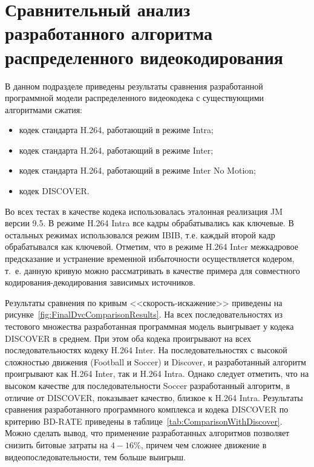 \section{Сравнительный анализ разработанного алгоритма распределенного видеокодирования}

В данном подразделе приведены результаты сравнения разработанной программной модели распределенного видеокодека с существующими алгоритмами сжатия: 
\begin{itemize}
    \item кодек стандарта H.264, работающий в режиме Intra;
    \item кодек стандарта H.264, работающий в режиме Inter;
    \item кодек стандарта H.264, работающий в режиме Inter No Motion;
    \item кодек DISCOVER.
\end{itemize}

Во всех тестах в качестве кодека использовалась эталонная реализация JM версии 9.5. В режиме H.264 Intra все кадры обрабатывались как ключевые. В остальных режимах использовался режим IBIB, т.е. каждый второй кадр обрабатывался как ключевой. Отметим, что в режиме H.264 Inter межкадровое предсказание и устранение временной избыточности осуществляется кодером, т.~е. данную кривую можно рассматривать в качестве примера для совместного кодирования-декодирования зависимых источников.

Результаты сравнения по кривым <<скорость-искажение>> приведены на рисунке~\ref{fig:FinalDvcComparisonResults}. На всех последовательностях из тестового множества разработанная программная модель выигрывает у кодека DISCOVER в среднем. При этом оба кодека проигрывают на всех последовательностях кодеку H.264 Inter. На последовательностях с высокой сложностью движения (Football и Soccer) и Discover, и разработанный алгоритм проигрывают как H.264 Inter, так и H.264 Intra. Однако следует отметить, что на высоком качестве для последовательности Soccer разработанный алгоритм, в отличие от DISCOVER, показывает качество, близкое к H.264 Intra.
Результаты сравнения разработанного программного комплекса и кодека DISCOVER по критерию BD-RATE приведены в таблице~\ref{tab:ComparisonWithDiscover}. Можно сделать вывод, что применение разработанных алгоритмов позволяет снизить битовые затраты на $4-16 \%$, причем чем сложнее движение в видеопоследовательности, тем больше выигрыш.

